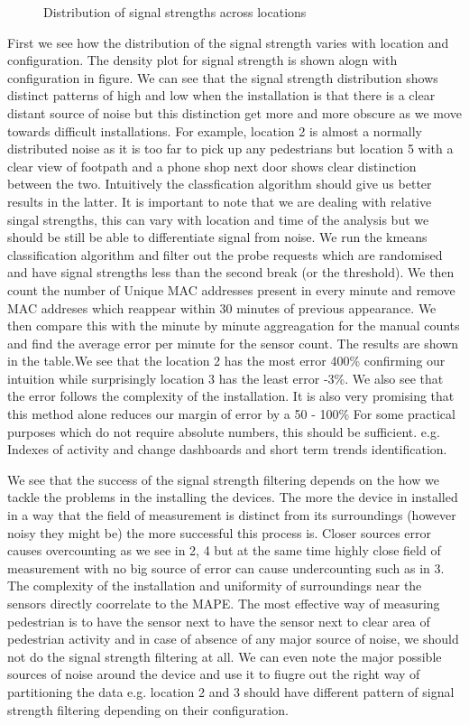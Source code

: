 \begin{figure}
	\caption{Distribution of signal strengths across locations} \label{methodology_schematic}
\end{figure}

First we see how the distribution of the signal strength varies with location and configuration. 
The density plot for signal strength is shown alogn with configuration in figure.
We can see that the signal strength distribution shows distinct patterns of high and low when the installation is that there is a clear distant source of noise but this distinction get more and more obscure as we move towards difficult installations. 
For example, location 2 is almost a normally distributed noise as it is too far to pick up any pedestrians but location 5 with a clear view of footpath and a phone shop next door shows clear distinction between the two. 
Intuitively the classfication algorithm should give us better results in the latter. 
It is important to note that we are dealing with relative singal strengths, this can vary with location and time of the analysis but we should be still be able to differentiate signal from noise. 
We run the kmeans classification algorithm and filter out the probe requests which are randomised and have signal strengths less than the second break (or the threshold). 
We then count the number of Unique MAC addresses present in every minute and remove MAC addreses which reappear within 30 minutes of previous appearance. 
We then compare this with the minute by minute aggreagation for the manual counts and find the average error per minute for the sensor count. 
The results are shown in the table.We see that the location 2 has the most error 400\% confirming our intuition while surprisingly location 3 has the least error -3\%. 
We also see that the error follows the complexity of the installation. 
It is also very promising that this method alone reduces our margin of error by a 50 - 100\%
For some practical purposes which do not require absolute numbers, this should be sufficient. 
e.g. Indexes of activity and change dashboards and short term trends identification.

We see that the success of the signal strength filtering depends on the how we tackle the problems in the installing the devices.
The more the device in installed in a way that the field of measurement is distinct from its surroundings (however noisy they might be) the more successful this process is.
Closer sources error causes overcounting as we see in 2, 4 but at the same time highly close field of measurement with no big source of error can cause undercounting such as in 3. The complexity of the installation and uniformity of surroundings near the sensors directly coorrelate to the MAPE.
The most effective way of measuring pedestrian is to have the sensor next to have the sensor next to clear area of pedestrian activity and in case of absence of any major source of noise, we should not do the signal strength filtering at all. We can even note the major possible sources of noise around the device and use it to fiugre out the right way of partitioning the data e.g. location 2 and 3 should have different pattern of signal strength filtering depending on their configuration.

